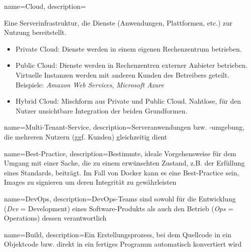 



{%
  name={Cloud},
  description={Eine Serverinfrastruktur, die Dienste (Anwendungen, Plattformen, etc.) zur Nutzung bereitstellt.
    \begin{itemize}
      \item Private Cloud: Dienste werden in einem eigenen Rechenzentrum betrieben.
      \item Public Cloud: Dienste werden in Rechenzentren externer Anbieter betrieben. Virtuelle Instanzen werden mit anderen Kunden des Betreibers geteilt. Beispiele: \emph{Amazon Web Services}, \emph{Microsoft Azure}
      \item Hybrid Cloud: Mischform aus Private und Public Cloud. Nahtlose, für den Nutzer unsichtbare Integration der beiden Grundformen.
    \end{itemize}
  }
}

{%
  name={Multi-Tenant-Service},
  description={Serveranwendungen bzw. -umgebung, die mehreren Nutzern (ggf. Kunden) gleichzeitig dient}
}

{%
  name={Best-Practice},
  description={Bestimmte, ideale Vorgehensweise für dem Umgang mit einer Sache, die zu einem erwünschten Zustand, z.B. der Erfüllung eines Standards, beiträgt. Im Fall von Docker kann es eine Best-Practice sein, Images zu signieren um deren Integrität zu gewährleisten}
}

{%
  name={DevOps},
  description={DevOps-Teams sind sowohl für die Entwicklung (\emph{Dev} = Development) eines Software-Produkts als auch den Betrieb (\emph{Ops} = Operations) dessen verantwortlich}
}

{%
  name={Build},
  description={Ein Erstellungsprozess, bei dem Quellcode in ein Objektcode bzw. direkt in ein fertiges Programm automatisch konvertiert wird}
}

